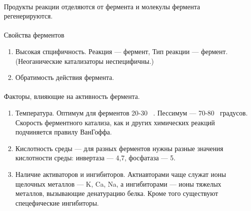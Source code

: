 
\paragraph*{}Продукты реакции отделяются от фермента и молекулы фермента регенерируются. 


\paragraph*{}Свойства ферментов

\begin{enumerate}

	\item Высокая спцифичность. Реакция — фермент, Тип реакции — фермент. (Неоганические катализаторы неспецифичны.)
	\item Обратимость действия фермента.

\end{enumerate}

\paragraph*{}Факторы, влияющие на активность фермента.

\begin{enumerate}

	\item Температура. Оптимум для ферментов 20-30~ \celsius. Пессимум — 70-80~ \celsius градусов. Скорость ферментного катализа, как и других химических реакций подчиняется правилу ВанГоффа.
	\item Кислотность среды — для разных ферментов нужны разные значения кислотности среды: инвертаза — 4,7, фосфатаза — 5.
	\item Наличие активаторов и ингибиторов. Актиавторами чаще служат ионы щелочных металлов — K, Ca, Na, а ингибиторами — ионы тяжелых металлов, вызывающие денатурацию белка. Кроме того существуют спецефические ингибиторы.

\end{enumerate}

